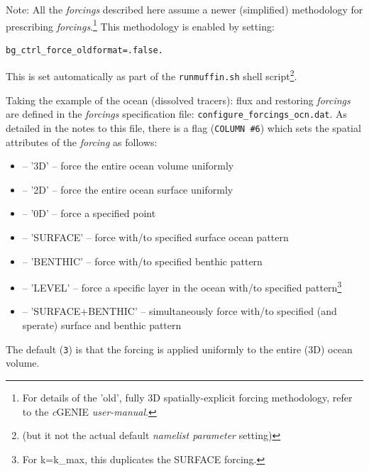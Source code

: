 \documentclass[11pt,fleqn]{book} %
\begin{document}
Note: All the \textit{forcings} described here assume a newer (simplified) methodology for prescribing \textit{forcings}.\footnote{For details of the 'old', fully 3D spatially-explicit forcing methodology, refer to the \textit{c}GENIE \textit{user-manual}.
} This methodology is enabled by setting:
\vspace{-2pt}\small\begin{verbatim}
bg_ctrl_force_oldformat=.false.
\end{verbatim}\vspace{-2pt}\normalsize
This is set automatically as part of the \texttt{runmuffin.sh} shell script\footnote{(but it not the actual default \textit{namelist parameter} setting)}.

Taking the example of the ocean (dissolved tracers): flux and restoring \textit{forcings} are defined in the \textit{forcings} specification file: \texttt{configure\_forcings\_ocn.dat}. As detailed in the notes to this file, there is a flag (\texttt{COLUMN \#6}) which sets the spatial attributes of the \textit{forcing} as follows: 
\vspace{1mm}
\begin{itemize}[noitemsep]
\item [3] -- '3D' -- force the entire ocean volume uniformly
\item [2] -- '2D' -- force the entire ocean surface uniformly
\item [0] -- '0D' -- force a specified point
\item [-1] -- 'SURFACE' -- force with/to specified surface ocean pattern
\item [-2] -- 'BENTHIC' -- force with/to specified benthic pattern
\item [-3] -- 'LEVEL' -- force a specific layer in the ocean with/to specified pattern\footnote{For k=k\_max, this duplicates the SURFACE forcing.}
\item [-4] -- 'SURFACE+BENTHIC' -- simultaneously force with/to specified (and sperate) surface and benthic pattern
\end{itemize}
\vspace{1mm}
The default (\texttt{3}) is that the forcing is applied uniformly to the entire (3D) ocean volume.
\end{document}
